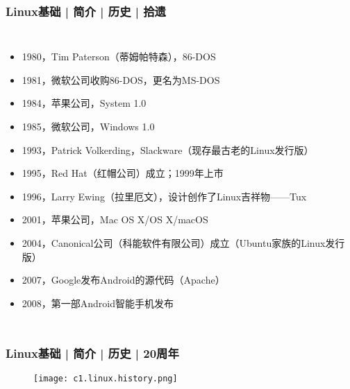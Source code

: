 \begin{frame}
  \frametitle{Linux基础 | 简介 | 历史 | 拾遗}
  \begin{columns}
  \begin{itemize}[<+->]
    \item 1980，Tim Paterson（蒂姆\textbullet 帕特森），86-DOS
    \item 1981，微软公司收购86-DOS，更名为MS-DOS
    \item 1984，苹果公司，System 1.0
    \item 1985，微软公司，Windows 1.0
    \item 1993，Patrick Volkerding，Slackware（现存最古老的Linux发行版）
    \item 1995，Red Hat（红帽公司）成立；1999年上市
    \item 1996，Larry Ewing（拉里\textbullet 厄文），设计创作了Linux吉祥物——\alert{Tux}
    \item 2001，苹果公司，Mac OS X/OS X/macOS
    \item 2004，Canonical公司（科能软件有限公司）成立（Ubuntu家族的Linux发行版）
    \item 2007，Google发布Android的源代码（Apache）
    \item 2008，第一部Android智能手机发布
  \end{itemize}
  \end{columns}
\end{frame}

\begin{frame}
  \frametitle{Linux基础 | 简介 | 历史 | 20周年}
  \begin{figure}
    \centering
    \texttt{[image: c1.linux.history.png]}
  \end{figure}
\end{frame}

